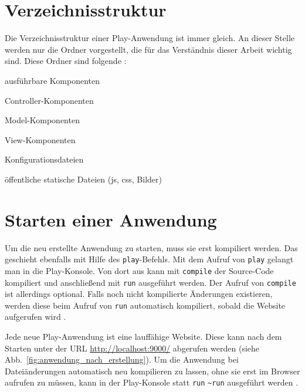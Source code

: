 

\section{Verzeichnisstruktur} %
\label{sec:verzeichnisstruktur}

Die Verzeichnisstruktur einer Play-Anwendung ist immer gleich.
An dieser Stelle werden nur die Ordner vorgestellt, die für das Verständnis dieser Arbeit wichtig sind.
Diese Ordner sind folgende \cite[vgl.][]{play_verzeichnisstruktur}:

\begin{description}[leftmargin=!,labelwidth=\widthof{\bfseries app/controllers/}]
  \item[app/] ausführbare Komponenten
  \item[app/controllers/] Controller-Komponenten
  \item[app/models/] Model-Komponenten
  \item[app/views/] View-Komponenten
  \item[conf/] Konfigurationsdateien
  \item[public/] öffentliche statische Dateien (\gls{js}, \gls{css}, Bilder)
\end{description}



\section{Starten einer Anwendung} %
\label{sec:starten_einer_anwendung}

Um die neu erstellte Anwendung zu starten, muss sie erst kompiliert werden.
Das geschieht ebenfalls mit Hilfe des \lstinline|play|-Befehls.
Mit dem Aufruf von \lstinline|play| gelangt man in die Play-Konsole.
Von dort aus kann mit \lstinline|compile| der Source-Code kompiliert und anschließend mit \lstinline|run| ausgeführt werden.
Der Aufruf von \lstinline|compile| ist allerdings optional.
Falls noch nicht kompilierte Änderungen existieren, werden diese beim Aufruf von \lstinline|run| automatisch kompiliert, sobald die Website aufgerufen wird \cite[vgl.][]{play_compile}.

Jede neue Play-Anwendung ist eine lauffähige Website.
Diese kann nach dem Starten unter der URL \url{http://localhost:9000/} abgerufen werden (siehe Abb.~\ref{fig:anwendung_nach_erstellung}).
Um die Anwendung bei Dateiänderungen automatisch neu kompilieren zu lassen, ohne sie erst im Browser aufrufen zu müssen, kann in der Play-Konsole statt \lstinline|run| \lstinline|~run| ausgeführt werden \cite[vgl.][S.~12--13]{play_for_scala_v8}.

